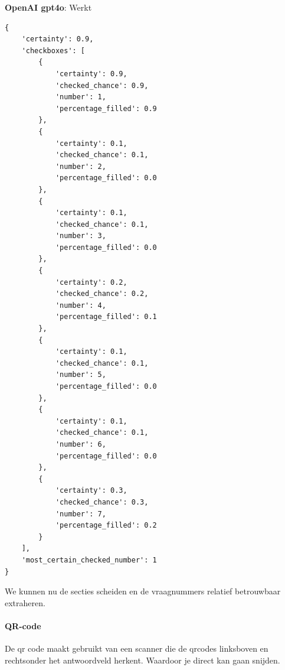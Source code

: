 \documentclass[12pt]{article}
\begin{document}
\begin{samepage}
    
\textbf{OpenAI gpt4o}: Werkt
\begin{listing}[H]
    
    \begin{verbatim}
{
    'certainty': 0.9, 
    'checkboxes': [
        {
            'certainty': 0.9, 
            'checked_chance': 0.9, 
            'number': 1, 
            'percentage_filled': 0.9
        }, 
        {
            'certainty': 0.1, 
            'checked_chance': 0.1, 
            'number': 2, 
            'percentage_filled': 0.0
        }, 
        {
            'certainty': 0.1, 
            'checked_chance': 0.1, 
            'number': 3, 
            'percentage_filled': 0.0
        }, 
        {
            'certainty': 0.2, 
            'checked_chance': 0.2, 
            'number': 4, 
            'percentage_filled': 0.1
        }, 
        {
            'certainty': 0.1, 
            'checked_chance': 0.1, 
            'number': 5, 
            'percentage_filled': 0.0
        }, 
        {
            'certainty': 0.1, 
            'checked_chance': 0.1, 
            'number': 6, 
            'percentage_filled': 0.0
        },
        {
            'certainty': 0.3, 
            'checked_chance': 0.3, 
            'number': 7, 
            'percentage_filled': 0.2
        }
    ], 
    'most_certain_checked_number': 1
}
\end{verbatim}
\end{listing}
\noindent We kunnen nu de secties scheiden en de vraagnummers relatief betrouwbaar extraheren.
\end{samepage}

\pagebreak

\paragraph*{QR-code}De qr code maakt gebruikt van een scanner die de qrcodes linksboven en rechtsonder het antwoordveld herkent. Waardoor je direct kan gaan snijden.\\
\end{document}
